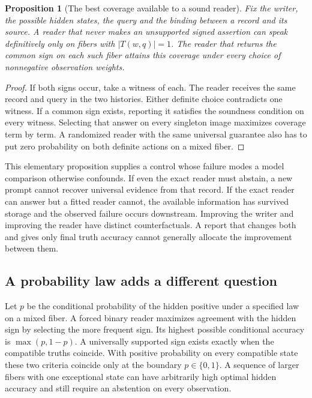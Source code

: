 \documentclass[12pt,letterpaper]{article}
\newtheorem{proposition}{Proposition}\newtheorem{lemma}[proposition]{Lemma}
\begin{document}
\begin{proposition}[The best coverage available to a sound reader]
Fix the writer, the possible hidden states, the query and the binding between a record and its source. A reader that never makes an unsupported signed assertion can speak definitively only on fibers with $|T(w,q)|=1$. The reader that returns the common sign on each such fiber attains this coverage under every choice of nonnegative observation weights.
\end{proposition}
\begin{proof}
If both signs occur, take a witness of each. The reader receives the same record and query in the two histories. Either definite choice contradicts one witness. If a common sign exists, reporting it satisfies the soundness condition on every witness. Selecting that answer on every singleton image maximizes coverage term by term. A randomized reader with the same universal guarantee also has to put zero probability on both definite actions on a mixed fiber.
\end{proof}

This elementary proposition supplies a control whose failure modes a model comparison otherwise confounds. If even the exact reader must abstain, a new prompt cannot recover universal evidence from that record. If the exact reader can answer but a fitted reader cannot, the available information has survived storage and the observed failure occurs downstream. Improving the writer and improving the reader have distinct counterfactuals. A report that changes both and gives only final truth accuracy cannot generally allocate the improvement between them.

\subsection{A probability law adds a different question}
Let $p$ be the conditional probability of the hidden positive under a specified law on a mixed fiber. A forced binary reader maximizes agreement with the hidden sign by selecting the more frequent sign. Its highest possible conditional accuracy is $\max(p,1-p)$. A universally supported sign exists exactly when the compatible truths coincide. With positive probability on every compatible state these two criteria coincide only at the boundary $p\in\{0,1\}$. A sequence of larger fibers with one exceptional state can have arbitrarily high optimal hidden accuracy and still require an abstention on every observation.
\end{document}
